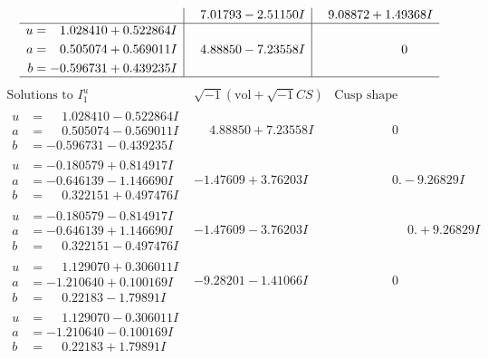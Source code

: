 \documentclass[1p]{elsarticle_modified}
\theoremstyle{definition}
\newcommand{\I}{\sqrt{-1}}
\begin{document}
$$\begin{array}{c|c|c}
 & \phantom{-}7.01793 - 2.51150 I & \phantom{-}9.08872 + 1.49368 I \\ \hline\begin{aligned}
u &= \phantom{-}1.028410 + 0.522864 I \\
a &= \phantom{-}0.505074 + 0.569011 I \\
b &= -0.596731 + 0.439235 I\end{aligned}
 & \phantom{-}4.88850 - 7.23558 I & \phantom{-0.000000 } 0\\
 \hline 
 \end{array}$$\newpage$$\begin{array}{c|c|c}  
\text{Solutions to }I^u_{1}& \I (\text{vol} + \sqrt{-1}CS) & \text{Cusp shape}\\
 \hline 
\begin{aligned}
u &= \phantom{-}1.028410 - 0.522864 I \\
a &= \phantom{-}0.505074 - 0.569011 I \\
b &= -0.596731 - 0.439235 I\end{aligned}
 & \phantom{-}4.88850 + 7.23558 I & \phantom{-0.000000 } 0 \\ \hline\begin{aligned}
u &= -0.180579 + 0.814917 I \\
a &= -0.646139 - 1.146690 I \\
b &= \phantom{-}0.322151 + 0.497476 I\end{aligned}
 & -1.47609 + 3.76203 I & \phantom{-0.000000 } 0. - 9.26829 I \\ \hline\begin{aligned}
u &= -0.180579 - 0.814917 I \\
a &= -0.646139 + 1.146690 I \\
b &= \phantom{-}0.322151 - 0.497476 I\end{aligned}
 & -1.47609 - 3.76203 I & \phantom{-0.000000 -}0. + 9.26829 I \\ \hline\begin{aligned}
u &= \phantom{-}1.129070 + 0.306011 I \\
a &= -1.210640 + 0.100169 I \\
b &= \phantom{-}0.22183 - 1.79891 I\end{aligned}
 & -9.28201 - 1.41066 I & \phantom{-0.000000 } 0 \\ \hline\begin{aligned}
u &= \phantom{-}1.129070 - 0.306011 I \\
a &= -1.210640 - 0.100169 I \\
b &= \phantom{-}0.22183 + 1.79891 I\end{aligned}

\end{array}$$
\end{document}

